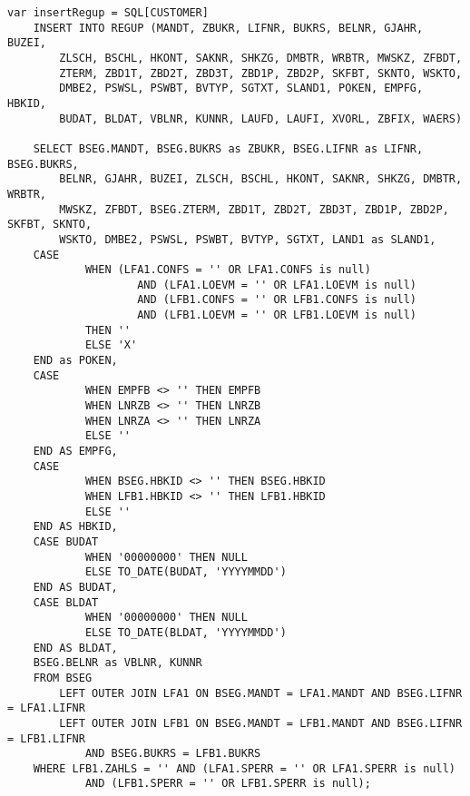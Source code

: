 \clearpage
\begin{lstlisting}[caption={Allgemeiner Teil des SQL-Statements für die Belegpositionen}, label={lst:regupgeneral}, language=JavaScriptSQL2, basicstyle=\ttfamily\scriptsize]
var insertRegup = SQL[CUSTOMER]
    INSERT INTO REGUP (MANDT, ZBUKR, LIFNR, BUKRS, BELNR, GJAHR, BUZEI,
		ZLSCH, BSCHL, HKONT, SAKNR, SHKZG, DMBTR, WRBTR, MWSKZ, ZFBDT,
		ZTERM, ZBD1T, ZBD2T, ZBD3T, ZBD1P, ZBD2P, SKFBT, SKNTO, WSKTO,
		DMBE2, PSWSL, PSWBT, BVTYP, SGTXT, SLAND1, POKEN, EMPFG, HBKID,
		BUDAT, BLDAT, VBLNR, KUNNR, LAUFD, LAUFI, XVORL, ZBFIX, WAERS)

    SELECT BSEG.MANDT, BSEG.BUKRS as ZBUKR, BSEG.LIFNR as LIFNR, BSEG.BUKRS,
		BELNR, GJAHR, BUZEI, ZLSCH, BSCHL, HKONT, SAKNR, SHKZG, DMBTR, WRBTR,
		MWSKZ, ZFBDT, BSEG.ZTERM, ZBD1T, ZBD2T, ZBD3T, ZBD1P, ZBD2P, SKFBT, SKNTO,
		WSKTO, DMBE2, PSWSL, PSWBT, BVTYP, SGTXT, LAND1 as SLAND1,
    CASE
			WHEN (LFA1.CONFS = '' OR LFA1.CONFS is null)
					AND (LFA1.LOEVM = '' OR LFA1.LOEVM is null)
					AND (LFB1.CONFS = '' OR LFB1.CONFS is null)
					AND (LFB1.LOEVM = '' OR LFB1.LOEVM is null)
			THEN ''
			ELSE 'X'
    END as POKEN,
    CASE
			WHEN EMPFB <> '' THEN EMPFB
			WHEN LNRZB <> '' THEN LNRZB
			WHEN LNRZA <> '' THEN LNRZA
			ELSE ''
    END AS EMPFG,
    CASE
			WHEN BSEG.HBKID <> '' THEN BSEG.HBKID
			WHEN LFB1.HBKID <> '' THEN LFB1.HBKID
			ELSE ''
    END AS HBKID,
    CASE BUDAT
			WHEN '00000000' THEN NULL
			ELSE TO_DATE(BUDAT, 'YYYYMMDD')
    END AS BUDAT,
    CASE BLDAT
			WHEN '00000000' THEN NULL
			ELSE TO_DATE(BLDAT, 'YYYYMMDD')
    END AS BLDAT,
    BSEG.BELNR as VBLNR, KUNNR
    FROM BSEG
		LEFT OUTER JOIN LFA1 ON BSEG.MANDT = LFA1.MANDT AND BSEG.LIFNR = LFA1.LIFNR
		LEFT OUTER JOIN LFB1 ON BSEG.MANDT = LFB1.MANDT AND BSEG.LIFNR = LFB1.LIFNR
			AND BSEG.BUKRS = LFB1.BUKRS
    WHERE LFB1.ZAHLS = '' AND (LFA1.SPERR = '' OR LFA1.SPERR is null)
			AND (LFB1.SPERR = '' OR LFB1.SPERR is null);
\end{lstlisting}